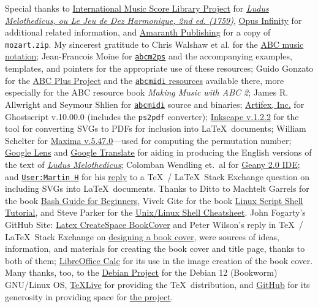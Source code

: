 \documentclass[a4paper,x11names,svgnames,10pt]{article}
\begin{document}
{Special thanks to \href{https://imslp.org}{International Music Score Library Project} for \href{https://imslp.org/wiki/Ludus_Melothedicus_(Anonymous)}{\it Ludus Melothedicus, ou Le Jeu de Dez Harmonique, 2nd ed. (1759)}, \href{https://opus-infinity.org}{Opus Infinity} for additional related information, and \href{http://www.amaranthpublishing.com/MozartDiceGame.htm}{Amaranth Publishing} for a copy of {\tt mozart.zip}. My sincerest gratitude to Chris Walshaw et al. for the \href{http://www.abcnotation.com/}{ABC music notation}; Jean-Francois Moine for \href{http://moinejf.free.fr/}{\tt abcm2ps} and the accompanying examples, templates, and pointers for the appropriate use of these resources; Guido Gonzato for the \href{http://abcplus.sourceforge.net/}{ABC Plus Project} and the \href{http://abcplus.sourceforge.net/#abcMIDI}{{\tt abcmidi} resources} available there, more especially for the ABC resource book {\em Making Music with ABC 2}; James R. Allwright and Seymour Shlien for \href{http://abc.sourceforge.net/abcMIDI}{\tt abcmidi} source and binaries; \href{https://artifex.com/}{Artifex, Inc.} for Ghostscript v.10.00.0 (includes the {\tt ps2pdf} converter); \href{https://www.inkscape.org/}{Inkscape v.1.2.2} for the tool for converting SVGs to PDFs for inclusion into \LaTeX\ documents; William Schelter for \href{https://maxima.sourceforge.io}{Maxima v.5.47.0}---used for computing the permutation number; \href{https://google.lens}{Google Lens} and \href{https://translate.google.com}{Google Translate} for aiding in producing the English versions of the text of \href{https://imslp.org/wiki/Ludus_Melothedicus_(Anonymous)}{{\em Ludus Melothedicus}}; Colomban Wendling et.\ al for \href{https://www.geany.org}{Geany 2.0 IDE}; and \href{https://tex.stackexchange.com/users/632/martin-h}{\tt User:Martin H} for his \href{https://tex.stackexchange.com/questions/2099/how-to-include-svg-diagrams-in-latex}{reply} to a \TeX\ / \LaTeX\ Stack Exchange question on including SVGs into \LaTeX\ documents. Thanks to  Ditto to Machtelt Garrels for the book \href{http://tldp.org/LDP/Bash-Beginners-Guide/html/Bash-Beginners-Guide.html}{Bash Guide for Beginners}, Vivek Gite for the book \href{http://www.freeos.com/guides/lsst/}{Linux Script Shell Tutorial}, and Steve Parker for the \href{http://steve-parker.org/sh/cheatsheet.pdf}{Unix/Linux Shell Cheatsheet}. John Fogarty's GitHub Site: \href{https://github.com/jfogarty/latex-createspace-bookcover}{Latex CreateSpace BookCover} and Peter Wilson's reply in  \TeX\ / \LaTeX\ Stack Exchange on \href{https://tex.stackexchange.com/questions/17579/how-can-i-design-a-book-cover}{designing a book cover}, were sources of ideas, information, and materials for creating the book cover and title page, thanks to both of them; \href{http://www.libreoffice.org/}{LibreOffice Calc} for its use in the image creation of the book cover.  Many thanks, too, to the \href{https://www.debian.org}{Debian Project} for the Debian 12 (Bookworm) GNU/Linux OS, \href{http://www.tug.org/texlive/}{TeXLive} for providing the \TeX\ distribution,  and \href{https://github.com}{GitHub} for its generosity in providing space for \href{https://github.com/justineuro/mdgBookSVG8Kit}{the project}.  

}
\end{document}

